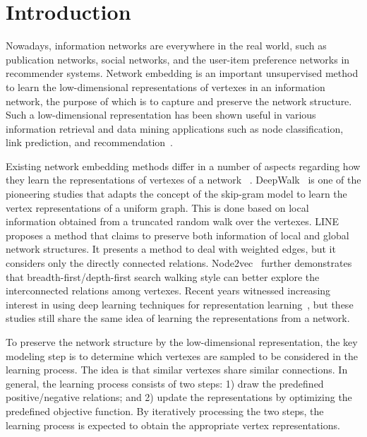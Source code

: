 \section{Introduction}


Nowadays, information networks are everywhere in the real world, such as publication networks, social networks, and the user-item preference networks in recommender systems. Network embedding is an important unsupervised method to learn the low-dimensional representations of vertexes in an information network, the purpose of which is to capture and preserve the network structure. Such a low-dimensional representation has been shown useful in various information retrieval and data mining applications such as node classification, link prediction, and recommendation~\cite{hne}.

Existing network embedding methods differ in a number of aspects regarding how they learn the representations of vertexes of a network ~\cite{wl,com,hpe,grarep,app}. DeepWalk~\cite{dw} is one of the pioneering studies that adapts the concept of the skip-gram model to learn the vertex representations of a uniform graph. This is done based on local information obtained from a truncated random walk over the vertexes.  LINE~\cite{line} proposes a method that claims to preserve both information of local and global network structures.
It presents a method to deal with weighted edges, but it considers only the directly connected relations.
Node2vec~\cite{n2v} further demonstrates that breadth-first/depth-first search walking style can better explore the interconnected relations among vertexes. Recent years witnessed increasing interest in using deep learning techniques for  representation learning~\cite{sdne,hne,dngr}, but these studies still share the same idea of learning the representations from a network.

To preserve the network structure by the low-dimensional representation, the key modeling step is to determine which vertexes are sampled to be considered in the learning process.  The idea is that similar vertexes share similar connections. In general, the learning process consists of two steps: 1) draw the predefined positive/negative relations; and 2) update the representations by optimizing the predefined objective function.  By iteratively processing the two steps, the learning process is expected to obtain the appropriate vertex representations.

